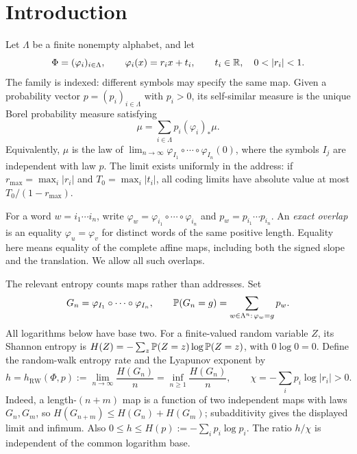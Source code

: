 \section{Introduction}\label{sec:introduction}

Let $\Lambda$ be a finite nonempty alphabet, and let
\[
 \Phi=(\varphi_i)_{i\in\Lambda},\qquad
 \varphi_i(x)=r_i x+t_i,\qquad t_i\in\R,\quad 0<|r_i|<1.
\]
The family is indexed: different symbols may specify the same map.
Given a probability vector $p=(p_i)_{i\in\Lambda}$ with $p_i>0$, its
self-similar measure is the unique Borel probability measure satisfying
\[
 \mu=\sum_{i\in\Lambda}p_i(\varphi_i)_*\mu.
\]
Equivalently, $\mu$ is the law of
$\lim_{n\to\infty}\varphi_{I_1}\circ\cdots\circ\varphi_{I_n}(0)$,
where the symbols $I_j$ are independent with law $p$.
The limit exists uniformly in the address: if
$r_{\max}=\max_i|r_i|$ and $T_0=\max_i|t_i|$, all coding limits
have absolute value at most $T_0/(1-r_{\max})$.

For a word $w=i_1\cdots i_n$, write
$\varphi_w=\varphi_{i_1}\circ\cdots\circ\varphi_{i_n}$ and
$p_w=p_{i_1}\cdots p_{i_n}$.  An \emph{exact overlap} is an equality
$\varphi_u=\varphi_v$ for distinct words of the same positive length.
Equality here means equality of the complete affine maps, including
both the signed slope and the translation.  We allow all such overlaps.

The relevant entropy counts maps rather than addresses.  Set
\[
 G_n=\varphi_{I_1}\circ\cdots\circ\varphi_{I_n},\qquad
 \P(G_n=g)=\sum_{w\in\Lambda^n:\,\varphi_w=g}p_w.
\]
All logarithms below have base two.  For a finite-valued random variable
$Z$, its Shannon entropy is $H(Z)=-\sum_z\P(Z=z)\log\P(Z=z)$,
with $0\log0=0$.  Define the random-walk entropy rate and the Lyapunov
exponent by
\begin{equation}\label{eq:rate-and-lyapunov}
 h=h_{\mathrm{RW}}(\Phi,p)
   :=\lim_{n\to\infty}\frac{H(G_n)}n
    =\inf_{n\ge1}\frac{H(G_n)}n,
 \qquad
 \chi=-\sum_i p_i\log|r_i|>0.
\end{equation}
Indeed, a length-$(n+m)$ map is a function of two independent maps
with laws $G_n,G_m$, so $H(G_{n+m})\le H(G_n)+H(G_m)$; subadditivity
gives the displayed limit and infimum.  Also
$0\le h\le H(p):=-\sum_i p_i\log p_i$.  The ratio $h/\chi$ is
independent of the common logarithm base.

